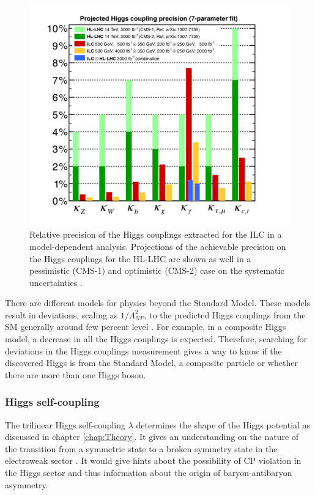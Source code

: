 \begin{figure}[htbp]
  \centering
  \includegraphics[width=0.7\linewidth]{chap2/fig/HiggsCouplings_LHCComp.png}
  \caption{Relative precision of the Higgs couplings extracted for the ILC in a model-dependent analysis. Projections of the achievable precision on the Higgs couplings for the HL-LHC are shown as well in a pessimistic (CMS-1) and optimistic (CMS-2) case on the systematic uncertainties \cite{Fujii:2015jha}.}  \label{fig:HiggsCouplings}
\end{figure}

There are different models for physics beyond the Standard Model. These models result in deviations, scaling as $1/\Lambda^2_{NP}$, to the predicted Higgs couplings from the SM generally around few percent level \cite{Gupta:2012mi}. For example, in a composite Higgs model, a decrease in all the Higgs couplings is expected. Therefore, searching for deviations in the Higgs couplings measurement gives a way to know if the discovered Higgs is from the Standard Model, a composite particle or whether there are more than one Higgs boson.

\subsubsection{Higgs self-coupling}

The trilinear Higgs self-coupling $\lambda$ determines the shape of the Higgs potential as discussed in chapter \ref{chap:Theory}. It gives an understanding on the nature of the transition from a symmetric state to a broken symmetry state in the electroweak sector \cite{Kajantie:1996mn}. It would give hints about the possibility of CP violation in the Higgs sector and thus information about the origin of baryon-antibaryon asymmetry.

